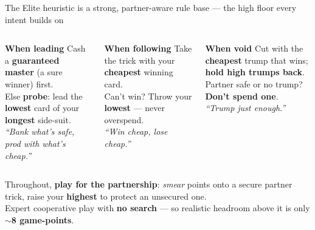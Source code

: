 \documentclass[10pt]{beamer}
\begin{document}
\begin{frame}{The Elite heuristic is a strong, partner-aware rule base --- the high floor every intent builds on}
  \begin{columns}[T]
      \centering
      \begin{block}{\centering\textbf{When leading}}
        \vspace{1em}
        \footnotesize
        Cash a \textbf{guaranteed master} (a sure winner) first.\\[4pt]
        Else \textbf{probe}: lead the \textbf{lowest} card of your \textbf{longest} side-suit.\\[4pt]
        \textit{``Bank what's safe, prod with what's cheap.''}
      \end{block}
      \centering
      \begin{block}{\centering\textbf{When following}}
        \vspace{1em}
        \footnotesize
        Take the trick with your \textbf{cheapest} winning card.\\[4pt]
        Can't win? Throw your \textbf{lowest} --- never overspend.\\[4pt]
        \textit{``Win cheap, lose cheap.''}
      \end{block}
      \centering
      \begin{block}{\centering\textbf{When void}}
        \vspace{1em}
        \footnotesize
        Cut with the \textbf{cheapest} trump that wins; \textbf{hold high trumps back}.\\[4pt]
        Partner safe or no trump? \textbf{Don't spend one}.\\[4pt]
        \textit{``Trump just enough.''}
      \end{block}
  \end{columns}
  \vspace{8pt}
  \centering
  \footnotesize
  Throughout, \textbf{play for the partnership}: \emph{smear} points onto a secure partner trick, raise your \textbf{highest} to protect an unsecured one.\\
  Expert cooperative play with \textbf{no search} --- so realistic headroom above it is only $\sim$\textbf{8 game-points}.
\end{frame}
\end{document}

